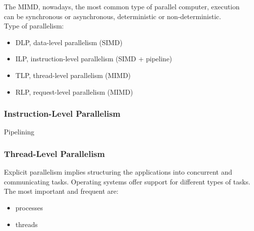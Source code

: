 The MIMD, nowadays, the most common type of parallel computer, execution can be synchronous or asynchronous,
deterministic or non-deterministic.\\

Type of parallelism:
\begin{itemize}
    \item DLP, data-level parallelism (SIMD)
    \item ILP, instruction-level parallelism (SIMD + pipeline)
    \item TLP, thread-level parallelism (MIMD)
    \item RLP, request-level parallelism (MIMD)
\end{itemize}

\subsubsection{Instruction-Level Parallelism}
Pipelining

\subsubsection{Thread-Level Parallelism}
Explicit parallelism implies structuring the applications into concurrent and communicating tasks.
Operating systems offer support for different types of tasks.
The most important and frequent are:
\begin{itemize}
    \item processes
    \item threads
\end{itemize}

